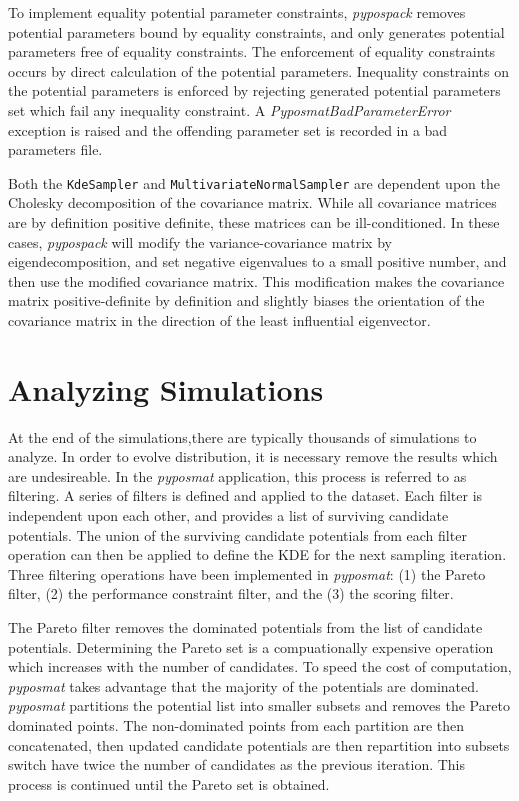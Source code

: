 To implement equality potential parameter constraints, \emph{pypospack} removes potential parameters bound by equality constraints, and only generates potential parameters free of equality constraints.  The enforcement of equality constraints occurs by direct calculation of the potential parameters.  Inequality constraints on the potential parameters is enforced by rejecting generated potential parameters set which fail any inequality constraint.  A \emph{PyposmatBadParameterError} exception is raised and the offending parameter set is recorded in a bad parameters file.

Both the \verb|KdeSampler| and \verb|MultivariateNormalSampler| are dependent upon the Cholesky decomposition of the covariance matrix.  While all covariance matrices are by definition positive definite, these matrices can be ill-conditioned.
In these cases, \emph{pypospack} will modify the variance-covariance matrix by eigendecomposition, and set negative eigenvalues to a small positive number, and then use the modified covariance matrix.
This modification makes the covariance matrix positive-definite by definition and slightly biases the orientation of the covariance matrix in the direction of the least influential eigenvector.

\section{Analyzing Simulations}
\label{sec:pypospack_analyze}
At the end of the simulations,there are typically thousands of simulations to analyze.  In order to evolve distribution, it is necessary remove the results which are undesireable.  In the \emph{pyposmat} application, this process is referred to as filtering.  A series of filters is defined and applied to the dataset.  Each filter is independent upon each other, and provides a list of surviving candidate potentials.  The union of the surviving candidate potentials from each filter operation can then be applied to define the KDE for the next sampling iteration.  Three filtering operations have been implemented in \emph{pyposmat}: (1) the Pareto filter, (2) the performance constraint filter, and the (3) the scoring filter.

The Pareto filter removes the dominated potentials from the list of candidate potentials.  Determining the Pareto set is a compuationally expensive operation which increases with the number of candidates.  To speed the cost of computation, \emph{pyposmat} takes advantage that the majority of the potentials are dominated.  \emph{pyposmat} partitions the potential list into smaller subsets and removes the Pareto dominated points.  The non-dominated points from each partition are then concatenated, then updated candidate potentials are then repartition into subsets switch have twice the number of candidates as the previous iteration.  This process is continued until the Pareto set is obtained.

